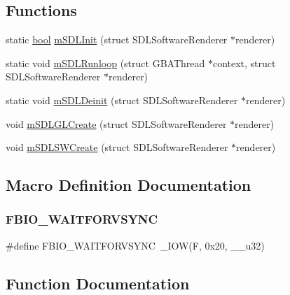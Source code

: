 \subsection*{Functions}
\begin{DoxyCompactItemize}
\item 
static \mbox{\hyperlink{libretro_8h_a4a26dcae73fb7e1528214a068aca317e}{bool}} \mbox{\hyperlink{pandora-sdl_8c_aed39e297edf44f1d18eb5228c4653bb0}{m\+S\+D\+L\+Init}} (struct S\+D\+L\+Software\+Renderer $\ast$renderer)
\item 
static void \mbox{\hyperlink{pandora-sdl_8c_a290e757b4ab3c47950e274fdf8d6c7ea}{m\+S\+D\+L\+Runloop}} (struct G\+B\+A\+Thread $\ast$context, struct S\+D\+L\+Software\+Renderer $\ast$renderer)
\item 
static void \mbox{\hyperlink{pandora-sdl_8c_a2e844dec0a5e889059cdf4f395679121}{m\+S\+D\+L\+Deinit}} (struct S\+D\+L\+Software\+Renderer $\ast$renderer)
\item 
void \mbox{\hyperlink{pandora-sdl_8c_ac0f0fed0a8f63ea7109a5427609fb678}{m\+S\+D\+L\+G\+L\+Create}} (struct S\+D\+L\+Software\+Renderer $\ast$renderer)
\item 
void \mbox{\hyperlink{pandora-sdl_8c_a272167ed06db7f73e361c3bfbd158698}{m\+S\+D\+L\+S\+W\+Create}} (struct S\+D\+L\+Software\+Renderer $\ast$renderer)
\end{DoxyCompactItemize}


\subsection{Macro Definition Documentation}
\mbox{\label{pandora-sdl_8c_ad169cbc3efb007545485b3ca1b5d7e6a}} 
\subsubsection{\texorpdfstring{F\+B\+I\+O\+\_\+\+W\+A\+I\+T\+F\+O\+R\+V\+S\+Y\+NC}{FBIO\_WAITFORVSYNC}}
{\footnotesize\ttfamily \#define F\+B\+I\+O\+\_\+\+W\+A\+I\+T\+F\+O\+R\+V\+S\+Y\+NC~\+\_\+\+I\+OW(\textquotesingle{}F\textquotesingle{}, 0x20, \+\_\+\+\_\+u32)}



\subsection{Function Documentation}
\mbox{\label{pandora-sdl_8c_a2e844dec0a5e889059cdf4f395679121}} 
